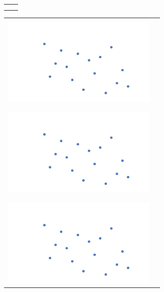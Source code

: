 \documentclass[a4paper,12pt]{article}
\begin{document}
\begin{center}
\begin{tabular}{|c|c|}
\hspace{10pt} & \hspace{10pt} \\
 & \\
\hline
\end{tabular}
\end{center}


\newpage

\begin{center}
\begin{tabular}{|c|c|}
\hline
 & \\
\hspace{10pt}\includegraphics[width=7.5cm]{../images/spatial_subd.pdf}
\hspace{10pt} & \hspace{175pt} \\
 & \\
\hline
 & \\
\hspace{10pt}\includegraphics[width=7.5cm]{../images/spatial_subd.pdf}
\hspace{10pt} & \hspace{10pt} \\
 & \\
\hline
 & \\
\hspace{10pt}\includegraphics[width=7.5cm]{../images/spatial_subd.pdf}

\end{tabular}
\end{center}
\end{document}
